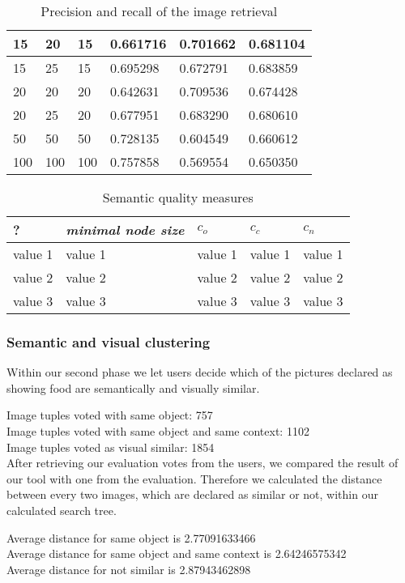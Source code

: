 \begin{table}[h]
\begin{tabular}{| p{2.5cm}| p{2.5cm}| p{2.5cm} || p{1.5cm} | p{1.5cm} | p{1.7cm} |}
    15 	& 20 & 15 & 0.661716 & 0.701662 & 0.681104 \\ \hline    
    15 	& 25 & 15 & 0.695298 & 0.672791 & 0.683859 \\ \hline
    20 	& 20 & 20 & 0.642631 & 0.709536 & 0.674428 \\ \hline
    20 	& 25 & 20 & 0.677951 & 0.683290 & 0.680610 \\ \hline  
    50	& 50 & 50 & 0.728135 & 0.604549 & 0.660612 \\ \hline
    100 	& 100 & 100 & 0.757858 & 0.569554 & 0.650350 \\ \hline
    \end{tabular}
    \caption{Precision and recall of the image retrieval}
	\label{tab_retrievalevaluation}
\end{table}


\begin{table}[h]
    \begin{tabular}{| p{1.8cm} | p{1.8cm} || p{1.5cm} | p{1.5cm} | p{1.5cm} |}
    \hline
    ?	& \emph{minimal node size} & $c_o $ & $c_c$ & $c_n$ \\ \hline
    value 1 		& value 1 	& value 1 	& value 1	& value 1 \\ \hline
    value 2 		& value 2	& value 2 	& value 2	& value 2 \\ \hline
    value 3	 	& value 3	& value 3 	& value 3	& value 3 \\
    \hline
    \end{tabular}
    \caption{Semantic quality measures}
	\label{tab_treeevaluation}
\end{table}

\subsubsection*{Semantic and visual clustering}

Within our second phase we let users decide which of the pictures declared as showing food are semantically and visually similar. 

Image tuples voted with same object: 757 \\
Image tuples voted with same object and same context: 1102 \\
Image tuples voted as visual similar: 1854 \\

After retrieving our evaluation votes from the users, we compared the result of our tool with one from the evaluation. Therefore we calculated the distance between every two images, which are declared as similar or not, within our calculated search tree. 

Average distance for same object  is 2.77091633466  \\
Average distance for same object and same context is 2.64246575342 \\
Average distance for not similar  is 2.87943462898 \\


